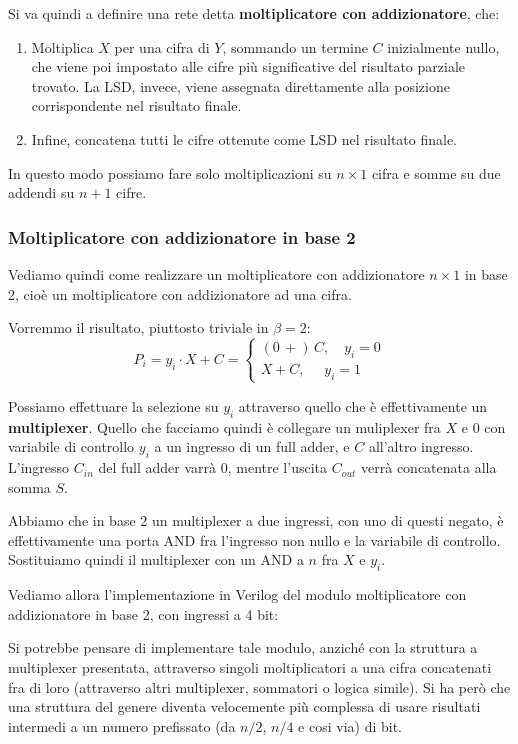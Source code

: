\documentclass[a4paper,11pt]{article}
\begin{document}
Si va quindi a definire una rete detta \textbf{moltiplicatore con addizionatore}, che:
\begin{enumerate}
	\item Moltiplica $X$ per una cifra di $Y$, sommando un termine $C$ inizialmente nullo, che viene poi impostato alle cifre più significative del risultato parziale trovato.
		La LSD, invece, viene assegnata direttamente alla posizione corrispondente nel risultato finale.
	\item Infine, concatena tutti le cifre ottenute come LSD nel risultato finale.
\end{enumerate}

In questo modo possiamo fare solo moltiplicazioni su $n \times 1$ cifra e somme su due addendi su $n+1$ cifre.

\subsubsection{Moltiplicatore con addizionatore in base 2}
Vediamo quindi come realizzare un moltiplicatore con addizionatore $n \times 1$ in base 2, cioè un moltiplicatore con addizionatore ad una cifra.

Vorremmo il risultato, piuttosto triviale in $\beta = 2$:
$$
P_i = y_i \cdot X + C =
	\begin{cases}
		(0 \, +) \, C, \quad y_i = 0 \\ 
		X + C, \quad \, \, y_i = 1
	\end{cases}
$$

Possiamo effettuare la selezione su $y_i$ attraverso quello che è effettivamente un \textbf{multiplexer}.
Quello che facciamo quindi è collegare un muliplexer fra $X$ e $0$ con variabile di controllo $y_i$ a un ingresso di un full adder, e $C$ all'altro ingresso.
L'ingresso $C_{in}$ del full adder varrà 0, mentre l'uscita $C_{out}$ verrà concatenata alla somma $S$.

Abbiamo che in base 2 un multiplexer a due ingressi, con uno di questi negato, è effettivamente una porta AND fra l'ingresso non nullo e la variabile di controllo.
Sostituiamo quindi il multiplexer con un AND a $n$ fra $X$ e $y_i$.

Vediamo allora l'implementazione in Verilog del modulo moltiplicatore con addizionatore in base 2, con ingressi a 4 bit:



Si potrebbe pensare di implementare tale modulo, anziché con la struttura a multiplexer presentata, attraverso singoli moltiplicatori a una cifra concatenati fra di loro (attraverso altri multiplexer, sommatori o logica simile).
Si ha però che una struttura del genere diventa velocemente più complessa di usare risultati intermedi a un numero prefissato (da $n/2$, $n/4$ e cosi via) di bit.
\end{document}
